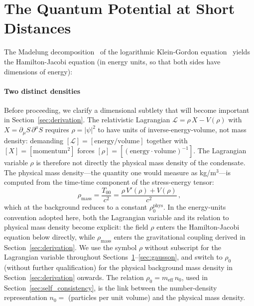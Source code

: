 \documentclass[12pt, a4paper]{article}
\newcommand{\meff}{m_{\mathrm{eff}}}
\begin{document}
\section{The Quantum Potential at Short Distances}
\label{sec:bohm}

The Madelung decomposition~\cite{madelung_1927} of the logarithmic Klein-Gordon equation~\cite{kulangiev_2026a} yields the Hamilton-Jacobi equation (in energy units, so that both sides have dimensions of energy):

\paragraph{Two distinct densities}
Before proceeding, we clarify a dimensional subtlety that will become important in Section~\ref{sec:derivation}. The relativistic Lagrangian $\mathcal{L} = \rho\,X - V(\rho)$ with $X = \partial_\mu S\,\partial^\mu S$ requires $\rho = |\psi|^2$ to have units of inverse-energy-volume, not mass density: demanding $[\mathcal{L}] = [\text{energy/volume}]$ together with $[X] = [\text{momentum}^2]$ forces $[\rho] = [(\text{energy}\cdot\text{volume})^{-1}]$. The Lagrangian variable $\rho$ is therefore not directly the physical mass density of the condensate. The physical mass density---the quantity one would measure as kg/m$^3$---is computed from the time-time component of the stress-energy tensor:
\begin{equation}
    \rho_{\mathrm{mass}} = \frac{T_{00}}{c^2}
    = \frac{\rho\,V'(\rho) + V(\rho)}{c^2}\,,
\label{eq:rho_mass_def}
\end{equation}
which at the background reduces to a constant $\rho_0^{\mathrm{phys}}$. In the energy-units convention adopted here, both the Lagrangian variable and its relation to physical mass density become explicit: the field $\rho$ enters the Hamilton-Jacobi equation below directly, while $\rho_{\mathrm{mass}}$ enters the gravitational coupling derived in Section~\ref{sec:derivation}. We use the symbol $\rho$ without subscript for the Lagrangian variable throughout Sections~\ref{sec:bohm}--\ref{sec:gausson}, and switch to $\rho_0$ (without further qualification) for the physical background mass density in Section~\ref{sec:derivation} onwards. The relation $\rho_0 = \meff\,n_0$, used in Section~\ref{sec:self_consistency}, is the link between the number-density representation $n_0 = $ (particles per unit volume) and the physical mass density.
\end{document}
